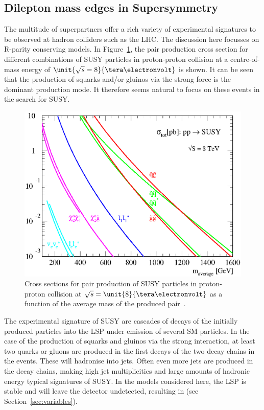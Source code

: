 \subsection{Dilepton mass edges in Supersymmetry}
\label{sec:edges}
The multitude of superpartners offer a rich variety of experimental signatures to be observed at hadron colliders such as the LHC. The discussion here focusses on R-parity conserving models. In Figure~\ref{fig:SUSYXSecs}, the pair production cross section for different combinations of SUSY particles in proton-proton collision at a centre-of-mass energy of $\unit{\sqrt{s}=8}{\tera\electronvolt}$ is shown. It can be seen that the production of squarks and/or gluinos via the strong force is the dominant production mode. It therefore seems natural to focus on these events in the search for SUSY.
\begin{figure}
\centering
\includegraphics[scale=0.6]{plots/THEO/prospino_lhc8.eps}
\caption{Cross sections for pair production of SUSY particles in proton-proton collision at $\sqrt{s} = \unit{8}{\tera\electronvolt}$ as a function of the average mass of the produced pair~\cite{ProspinoPlot,Beenakker:1999xh,Beenakker:1997ut,bib-nlo-nll-01}.}
\label{fig:SUSYXSecs}
\end{figure}

The experimental signature of SUSY are cascades of decays of the initially produced particles into the LSP under emission of several SM particles. In the case of the production of squarks and gluinos via the strong interaction, at least two quarks or gluons are produced in the first decays of the two decay chains in the events. These will hadronise into jets. Often even more jets are produced in the decay chains, making high jet multiplicities and large amounts of hadronic energy typical signatures of SUSY. In the models considered here, the LSP is stable and will leave the detector undetected, resulting in \MET (see Section~\ref{sec:variables}).

